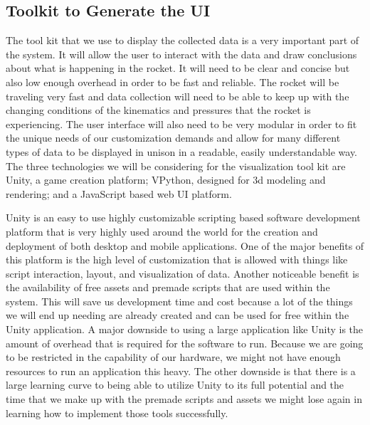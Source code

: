 \documentclass[10pt,draftclsnofoot,onecolumn]{IEEEtran}
\begin{document}
\subsection{Toolkit to Generate the UI}
The tool kit that we use to display the collected data is a very important part of the system. It will allow the user to interact with the data and draw conclusions about what is happening in the rocket. It will need to be clear and concise but also low enough overhead in order to be fast and reliable. The rocket will be traveling very fast and data collection will need to be able to keep up with the changing conditions of the kinematics and pressures that the rocket is experiencing. The user interface will also need to be very modular in order to fit the unique needs of our customization demands and allow for many different types of data to be displayed in unison in a readable, easily understandable way. The three technologies we will be considering for the visualization tool kit are Unity, a game creation platform; VPython, designed for 3d modeling and rendering; and a JavaScript based web UI platform. \par

Unity is an easy to use highly customizable scripting based software development platform that is very highly used around the world for the creation and deployment of both desktop and mobile applications. One of the major benefits of this platform is the high level of customization that is allowed with things like script interaction, layout, and visualization of data. Another noticeable benefit is the availability of free assets and premade scripts that are used within the system. This will save us development time and cost because a lot of the things we will end up needing are already created and can be used for free within the Unity application. A major downside to using a large application like Unity is the amount of overhead that is required for the software to run. Because we are going to be restricted in the capability of our hardware, we might not have enough resources to run an application this heavy. The other downside is that there is a large learning curve to being able to utilize Unity to its full potential and the time that we make up with the premade scripts and assets we might lose again in learning how to implement those tools successfully. \par
\end{document}
